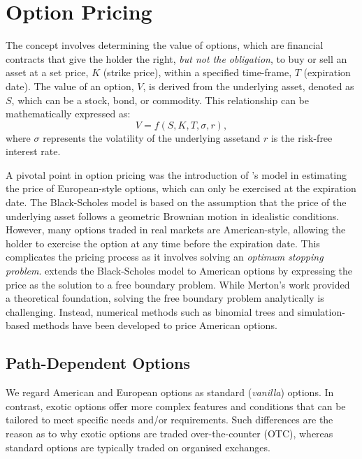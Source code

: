 \documentclass[a4paper]{report}
\begin{document}
\section{Option Pricing}\label{section:option_pricing}
The concept involves determining the value of options, which are financial contracts that give the holder the right, \textit{but not the obligation}, to buy or sell an asset at a set price, $K$ (strike price), within a specified time-frame, $T$ (expiration date). The value of an option, $V$, is derived from the underlying asset, denoted as $S$, which can be a stock, bond, or commodity. This relationship can be mathematically expressed as:
\begin{equation}
	V = f(S, K, T, \sigma, r),
\end{equation}
where $\sigma$ represents the volatility of the underlying asset\footnotemark[1] and $r$ is the risk-free interest rate\footnotemark[2].


A pivotal point in option pricing was the introduction of \citet{black1973pricing}'s model in estimating the price of European-style options, which can only be exercised at the expiration date. The Black-Scholes model is based on the assumption that the price of the underlying asset follows a geometric Brownian motion in idealistic conditions. However, many options traded in real markets are American-style, allowing the holder to exercise the option at any time before the expiration date. This complicates the pricing process as it involves solving an \textit{optimum stopping problem}. \citet{merton1973theory} extends the Black-Scholes model to American options by expressing the price as the solution to a free boundary problem. While Merton's work provided a theoretical foundation, solving the free boundary problem analytically is challenging. Instead, numerical methods such as binomial trees \citep{cox1979option} and simulation-based methods \citep{longstaff2001simulation} have been developed to price American options.

\subsection{Path-Dependent Options}\label{section:discrete_monitoring}
We regard American and European options as standard (\textit{vanilla}) options. In contrast, exotic options offer more complex features and conditions that can be tailored to meet specific needs and/or requirements. Such differences are the reason as to why exotic options are traded over-the-counter (OTC)\footnotemark[3], whereas standard options are typically traded on organised exchanges\footnotemark[4]. 
\end{document}
